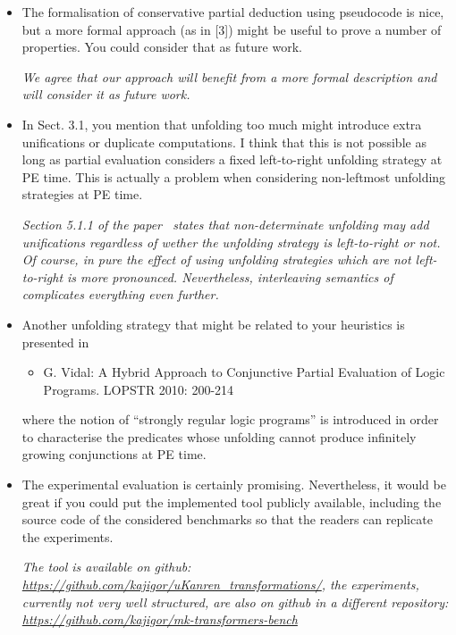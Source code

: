 \begin{itemize}
  \item The formalisation of conservative partial deduction using pseudocode is nice, but a more formal approach (as in [3]) might be useful to prove a number of properties. You could consider that as future work.

  \emph{We agree that our approach will benefit from a more formal description and will consider it as future work.}

  \item{In Sect. 3.1, you mention that unfolding too much might introduce extra unifications or duplicate computations. I think that this is not possible as long as partial evaluation considers a fixed left-to-right unfolding strategy at PE time. This is actually a problem when considering non-leftmost unfolding strategies at PE time.}

  \emph{Section 5.1.1 of the paper~\cite{de1999conjunctive} states that non-determinate unfolding may add unifications regardless of wether the unfolding strategy is left-to-right or not. Of course, in pure \pro the effect of using unfolding strategies which are not left-to-right is more pronounced. Nevertheless, interleaving semantics of \mk complicates everything even further.}

  \item Another unfolding strategy that might be related to your heuristics
  is presented in

  \begin{itemize}
    \item G. Vidal: A Hybrid Approach to Conjunctive Partial Evaluation of Logic
    Programs. LOPSTR 2010: 200-214
  \end{itemize}

  where the notion of ``strongly regular logic programs'' is introduced in order to characterise the predicates whose unfolding cannot produce infinitely growing conjunctions at PE time.


  \item {The experimental evaluation is certainly promising. Nevertheless,
  it would be great if you could put the implemented tool publicly available,
  including the source code of the considered benchmarks so that the readers
  can replicate the experiments.}

  \emph{The tool is available on github: \url{https://github.com/kajigor/uKanren_transformations/}, the experiments, currently not very well structured, are also on github in a different repository: \url{https://github.com/kajigor/mk-transformers-bench}}
\end{itemize}
